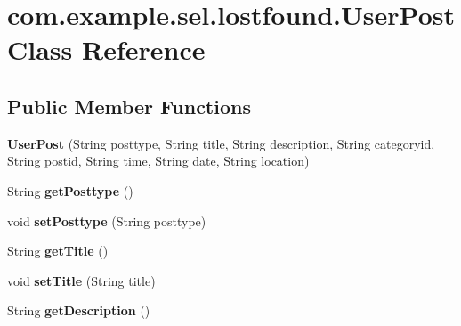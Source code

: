 \hypertarget{classcom_1_1example_1_1sel_1_1lostfound_1_1UserPost}{\section{com.\-example.\-sel.\-lostfound.\-User\-Post Class Reference}
\label{classcom_1_1example_1_1sel_1_1lostfound_1_1UserPost}
}
\subsection*{Public Member Functions}
\begin{DoxyCompactItemize}
\item 
\hypertarget{classcom_1_1example_1_1sel_1_1lostfound_1_1UserPost_a115af0c6a558f34125aa8bedc5edf6a1}{{\bfseries User\-Post} (String posttype, String title, String description, String categoryid, String postid, String time, String date, String location)}\label{classcom_1_1example_1_1sel_1_1lostfound_1_1UserPost_a115af0c6a558f34125aa8bedc5edf6a1}

\item 
\hypertarget{classcom_1_1example_1_1sel_1_1lostfound_1_1UserPost_abda6328cdfe66f43f6ffdf73b87d91c6}{String {\bfseries get\-Posttype} ()}\label{classcom_1_1example_1_1sel_1_1lostfound_1_1UserPost_abda6328cdfe66f43f6ffdf73b87d91c6}

\item 
\hypertarget{classcom_1_1example_1_1sel_1_1lostfound_1_1UserPost_a2123e2a801f39239ad7713e4df64d603}{void {\bfseries set\-Posttype} (String posttype)}\label{classcom_1_1example_1_1sel_1_1lostfound_1_1UserPost_a2123e2a801f39239ad7713e4df64d603}

\item 
\hypertarget{classcom_1_1example_1_1sel_1_1lostfound_1_1UserPost_a7ca77f66b088c6ffe832467a90e52dfd}{String {\bfseries get\-Title} ()}\label{classcom_1_1example_1_1sel_1_1lostfound_1_1UserPost_a7ca77f66b088c6ffe832467a90e52dfd}

\item 
\hypertarget{classcom_1_1example_1_1sel_1_1lostfound_1_1UserPost_a1ffca3ecc26e1663951a11d830af73f6}{void {\bfseries set\-Title} (String title)}\label{classcom_1_1example_1_1sel_1_1lostfound_1_1UserPost_a1ffca3ecc26e1663951a11d830af73f6}

\item 
\hypertarget{classcom_1_1example_1_1sel_1_1lostfound_1_1UserPost_a356b052bdfc18ab0ece0661ad66a86a0}{String {\bfseries get\-Description} ()}\label{classcom_1_1example_1_1sel_1_1lostfound_1_1UserPost_a356b052bdfc18ab0ece0661ad66a86a0}


\end{DoxyCompactItemize}
